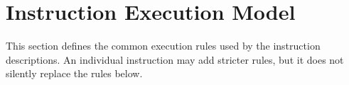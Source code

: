\clearpage
\section{Instruction Execution Model}\label{page:instruction-execution-model}

This section defines the common execution rules used by the instruction descriptions. An individual
instruction may add stricter rules, but it does not silently replace the rules below.
